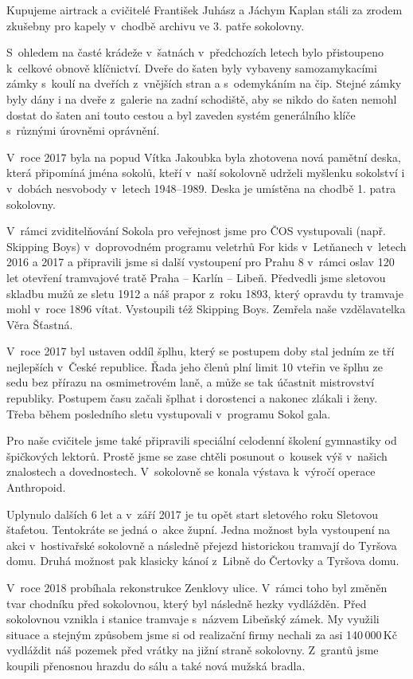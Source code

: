 \documentclass[a5paper, 11pt, twoside]{article}
\begin{document}
Kupujeme airtrack a cvičitelé František Juhász a Jáchym Kaplan stáli za
zrodem zkušebny pro kapely v~chodbě archivu ve 3. patře sokolovny.

{\sloppy S~ohledem na časté krádeže v~šatnách v~předchozích letech bylo
přistoupeno k~celkové obnově klíčnictví. Dveře do šaten byly vybaveny
samozamykacími zámky s~koulí na dveřích z~vnějších stran a s~odemykáním
na čip. Stejné zámky byly dány i na dveře z~galerie na zadní schodiště,
aby se nikdo do šaten nemohl dostat do šaten ani touto cestou a byl
zaveden systém generálního klíče s~různými úrovněmi oprávnění. \par}

V~roce 2017 byla na popud Vítka Jakoubka byla zhotovena nová pamětní
deska, která připomíná jména sokolů, kteří v~naší sokolovně udrželi
myšlenku sokolství i v~dobách nesvobody v~letech 1948--1989.
Deska je umístěna na chodbě 1. patra sokolovny.

V~rámci zviditelňování Sokola pro veřejnost jsme pro ČOS vystupovali
(např. Skipping Boys) v~doprovodném programu veletrhů For kids
v~Letňanech v~letech 2016 a 2017 a připravili jsme si další vystoupení pro
Prahu 8 v~rámci oslav 120 let otevření tramvajové tratě Praha -- Karlín
-- Libeň. Předvedli jsme sletovou skladbu mužů ze sletu 1912 a náš
prapor z~roku 1893, který opravdu ty tramvaje mohl v~roce 1896 vítat.
Vystoupili též Skipping Boys. Zemřela naše vzdělavatelka Věra Šťastná.

V~roce 2017 byl ustaven oddíl šplhu, který se postupem doby stal jedním
ze tří nejlepších v~České republice. Řada jeho členů plní limit 10
vteřin ve šplhu ze sedu bez přírazu na osmimetrovém laně, a může se tak
účastnit mistrovství republiky. Postupem času začali šplhat i dorostenci
a nakonec zlákali i ženy. Třeba během posledního sletu vystupovali
v~programu Sokol gala.

Pro naše cvičitele jsme také připravili speciální celodenní školení
gymnastiky od špičkových lektorů. Prostě jsme se zase chtěli posunout
o~kousek výš v~našich znalostech a dovednostech. V~sokolovně se konala
výstava k~výročí operace Anthropoid.

Uplynulo dalších 6 let a v~září 2017 je tu opět start sletového roku
Sletovou štafetou. Tentokráte se jedná o~akce župní. Jedna možnost byla
vystoupení na akci v~hostivařské sokolovně a následně přejezd
historickou tramvají do Tyršova domu. Druhá možnost pak klasicky kánoí
z~Libně do Čertovky a Tyršova domu.

V~roce 2018 probíhala rekonstrukce Zenklovy ulice. V~rámci toho byl
změněn tvar chodníku před sokolovnou, který byl následně hezky
vydlážděn. Před sokolovnou vznikla i stanice tramvaje s~názvem Libeňský
zámek. My využili situace a stejným způsobem jsme si od realizační firmy
nechali za asi 140\,000\,Kč vydláždit náš pozemek před vrátky na jižní
straně sokolovny. Z~grantů jsme koupili přenosnou hrazdu do sálu a také
nová mužská bradla.
\end{document}
